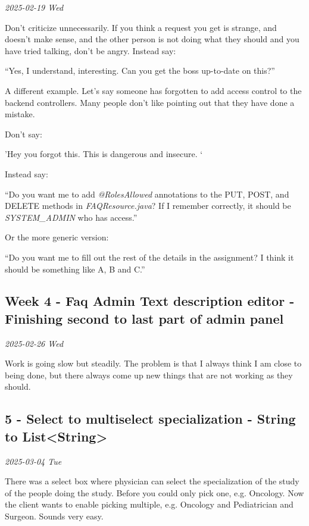 \documentclass[../main.tex]{subfiles}
\begin{document}
\noindent \textit{2025-02-19 Wed}

Don't criticize unnecessarily. If you think a request you get is strange, and doesn't make sense, and the other person is not doing what they should and you have tried talking, don't be angry. Instead say:

``Yes, I understand, interesting. 
Can you get the boss up-to-date on this?''



A different example. Let's say someone has forgotten to add access control to the backend controllers. Many people don't like pointing out that they have done a mistake.

Don't say:

'Hey you forgot this. This is dangerous and insecure. `

Instead say:

``Do you want me to add \emph{@RolesAllowed} annotations to the PUT, POST, and DELETE methods in \emph{FAQResource.java}? If I remember correctly, it should be \emph{SYSTEM\_ADMIN} who has access.''

Or the more generic version:

``Do you want me to fill out the rest of the details in the assignment? I think it should be something like A, B and C.''

\subsection{Week 4 - Faq Admin Text description editor - Finishing second to last part of admin panel}

\noindent \textit{2025-02-26 Wed}

Work is going slow but steadily. The problem is that I always think I am
close to being done, but there always come up new things that are not
working as they should. 

\subsection{5 - Select to multiselect specialization - String to List\textless String\textgreater{}}

\noindent \textit{2025-03-04 Tue}

There was a select box where physician can select the specialization of the study of the people doing the study. Before you could only pick one, e.g. Oncology. Now the client wants to enable picking multiple, e.g. Oncology and Pediatrician and Surgeon. Sounds very easy.
\end{document}
